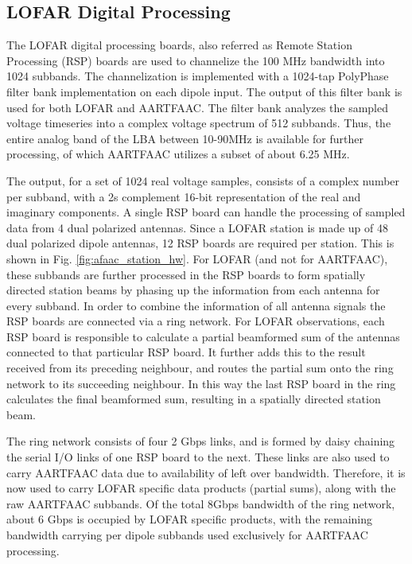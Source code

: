 \documentclass{ws-jai}
\begin{document}
\subsection  {LOFAR Digital  Processing}  The  LOFAR digital  processing
boards, also  referred as  Remote Station  Processing (RSP)  boards are  used to
channelize  the 100  MHz bandwidth  into 1024  subbands.  The  channelization is
implemented with a 1024-tap PolyPhase  filter bank implementation on each dipole
input. The output of  this filter bank is used for both  LOFAR and AARTFAAC. The
filter  bank analyzes  the sampled  voltage  timeseries into  a complex  voltage
spectrum  of 512  subbands. Thus,  the  entire analog  band of  the LBA  between
10-90MHz  is available  for further  processing,  of which  AARTFAAC utilizes  a
subset of about 6.25 MHz.

The output, for a set of 1024 real voltage samples, consists of a complex number
per  subband,  with a  2s  complement  16-bit  representation  of the  real  and
imaginary components.  A  single RSP board can handle the  processing of sampled
data from 4 dual polarized antennas. Since a LOFAR station is made up of 48 dual
polarized dipole antennas, 12 RSP boards are required per station. This is shown
in Fig.   \ref{fig:afaac_station_hw}.  For LOFAR  (and not for  AARTFAAC), these
subbands are  further processed  in the  RSP boards  to form  spatially directed
station  beams  by phasing  up  the  information  from  each antenna  for  every
subband. In  order to  combine the  information of all  antenna signals  the RSP
boards are connected via a ring  network. For LOFAR observations, each RSP board
is responsible to  calculate a partial beamformed sum of  the antennas connected
to that particular RSP board.  It further  adds this to the result received from
its preceding neighbour, and routes the partial sum onto the ring network to its
succeeding neighbour.  In this way the last RSP board in the ring calculates the
final beamformed sum, resulting in a spatially directed station beam.

The ring network consists of four 2  Gbps links, and is formed by daisy chaining
the serial I/O links of one RSP board to the next.  These links are also used to
carry AARTFAAC data  due to availability of left over  bandwidth.  Therefore, it
is now used to carry LOFAR specific data products (partial sums), along with the
raw AARTFAAC subbands.  Of the total  8Gbps bandwidth of the ring network, about
6 Gbps  is occupied  by LOFAR  specific products,  with the  remaining bandwidth
carrying per dipole subbands used exclusively for AARTFAAC processing.
\end{document}
